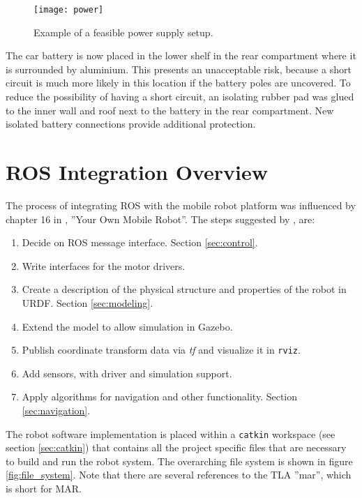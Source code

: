 \begin{figure}[H]
	\centering
	\texttt{[image: power]}
	\caption{Example of a feasible power supply setup.}
	\label{fig:power}
\end{figure}

The car battery is now placed in the lower shelf in the rear compartment where it is surrounded by aluminium. This presents an unacceptable risk, because a short circuit is much more likely in this location if the battery poles are uncovered. To reduce the possibility of having a short circuit, an isolating rubber pad was glued to the inner wall and roof next to the battery in the rear compartment. New isolated battery connections provide additional protection. 

\section{ROS Integration Overview}
\label{sec:integration}

The process of integrating \ac{ROS} with the mobile robot platform was influenced by chapter 16 in \cite{rosbook15}, ''Your Own Mobile Robot''. The steps suggested by \cite{rosbook15},  are:

\begin{enumerate}
	
	\item Decide on ROS message interface. Section \ref{sec:control}.
	\item Write interfaces for the motor drivers.
	\item Create a description of the physical structure and properties of the robot in \ac{URDF}. Section \ref{sec:modeling}.
	\item Extend the model to allow simulation in Gazebo.
	\item Publish coordinate transform data via \textit{tf} and visualize it in \texttt{rviz}.
	\item Add sensors, with driver and simulation support.
	\item Apply algorithms for navigation and other functionality. Section \ref{sec:navigation}.
\end{enumerate}



The robot software implementation is placed within a \texttt{catkin} workspace (see section \ref{sec:catkin}) that contains all the project specific files that are necessary to build and run the robot system. The overarching file system is shown in figure \ref{fig:file_system}. Note that there are several references to the \ac{TLA} ''mar'', which is short for \ac{MAR}.

